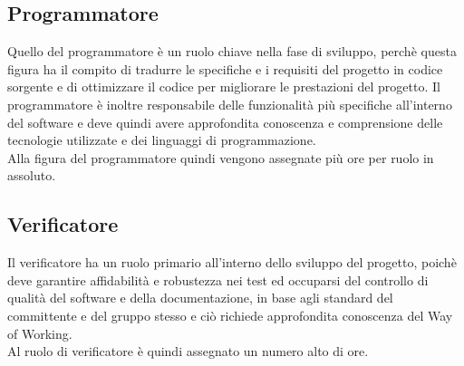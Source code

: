 \subsection{Programmatore}
Quello del programmatore è un ruolo chiave nella fase di sviluppo, perchè questa figura ha il compito di tradurre le specifiche e i requisiti del progetto in codice sorgente e di ottimizzare il codice per migliorare le prestazioni del progetto. Il programmatore è inoltre responsabile delle funzionalità più specifiche all'interno del software e deve quindi avere approfondita conoscenza e comprensione delle tecnologie utilizzate e dei linguaggi di programmazione.
\\
Alla figura del programmatore quindi vengono assegnate più ore per ruolo in assoluto. 

\subsection{Verificatore}
Il verificatore ha un ruolo primario all'interno dello sviluppo del progetto, poichè deve garantire affidabilità e robustezza nei test ed occuparsi del controllo di qualità del software e della documentazione, in base agli standard del committente e del gruppo stesso e ciò richiede approfondita conoscenza del Way of Working. 
\\
Al ruolo di verificatore è quindi assegnato un numero alto di ore.
